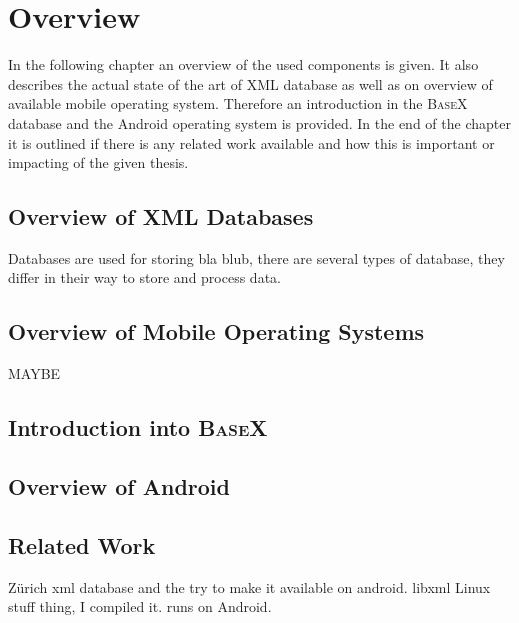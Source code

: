 \chapter{Overview}
\label{cha:overview}
In the following chapter an overview of the used components is given.
It also describes the actual state of the art of XML database as well as on overview of available mobile operating system.
Therefore an introduction in the \textsc{BaseX} database and the Android operating system is provided.
In the end of the chapter it is outlined if there is any related work available and how this is important or impacting of the given thesis.


\section{Overview of XML Databases}
\label{sec:overview:overview-of-xml-databases}
Databases are used for storing bla blub, there are several types of database, they differ in their way to store and process data.

\section{Overview of Mobile Operating Systems}
\label{sec:overview:overview-of-mobile-operating-systems}
MAYBE

\section{Introduction into \textsc{BaseX}}
\label{sec:overview:introduction-into-basex}

\section{Overview of Android}
\label{sec:overview:overview-of-android}

\section{Related Work}
\label{sec:overview:related-work}
Zürich xml database and the try to make it available on android.
libxml Linux stuff thing, I compiled it. runs on Android.
